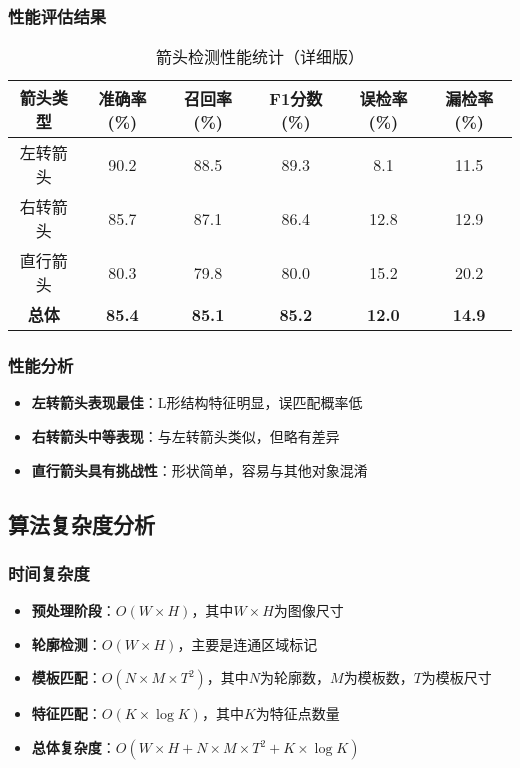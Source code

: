 \documentclass[12pt]{article}
\begin{document}
\subsubsection{性能评估结果}

\begin{table}[H]
\centering
\caption{箭头检测性能统计（详细版）}
\begin{tabular}{|c|c|c|c|c|c|}
\hline
\textbf{箭头类型} & \textbf{准确率(\%)} & \textbf{召回率(\%)} & \textbf{F1分数(\%)} & \textbf{误检率(\%)} & \textbf{漏检率(\%)} \\
\hline
左转箭头 & 90.2 & 88.5 & 89.3 & 8.1 & 11.5 \\
\hline
右转箭头 & 85.7 & 87.1 & 86.4 & 12.8 & 12.9 \\
\hline
直行箭头 & 80.3 & 79.8 & 80.0 & 15.2 & 20.2 \\
\hline
\textbf{总体} & \textbf{85.4} & \textbf{85.1} & \textbf{85.2} & \textbf{12.0} & \textbf{14.9} \\
\hline
\end{tabular}
\end{table}

\subsubsection{性能分析}

\begin{itemize}
    \item \textbf{左转箭头表现最佳}：L形结构特征明显，误匹配概率低
    \item \textbf{右转箭头中等表现}：与左转箭头类似，但略有差异
    \item \textbf{直行箭头具有挑战性}：形状简单，容易与其他对象混淆
\end{itemize}

\subsection{算法复杂度分析}

\subsubsection{时间复杂度}

\begin{itemize}
    \item \textbf{预处理阶段}：$O(W \times H)$，其中$W \times H$为图像尺寸
    \item \textbf{轮廓检测}：$O(W \times H)$，主要是连通区域标记
    \item \textbf{模板匹配}：$O(N \times M \times T^2)$，其中$N$为轮廓数，$M$为模板数，$T$为模板尺寸
    \item \textbf{特征匹配}：$O(K \times \log K)$，其中$K$为特征点数量
    \item \textbf{总体复杂度}：$O(W \times H + N \times M \times T^2 + K \times \log K)$
\end{itemize}
\end{document}

